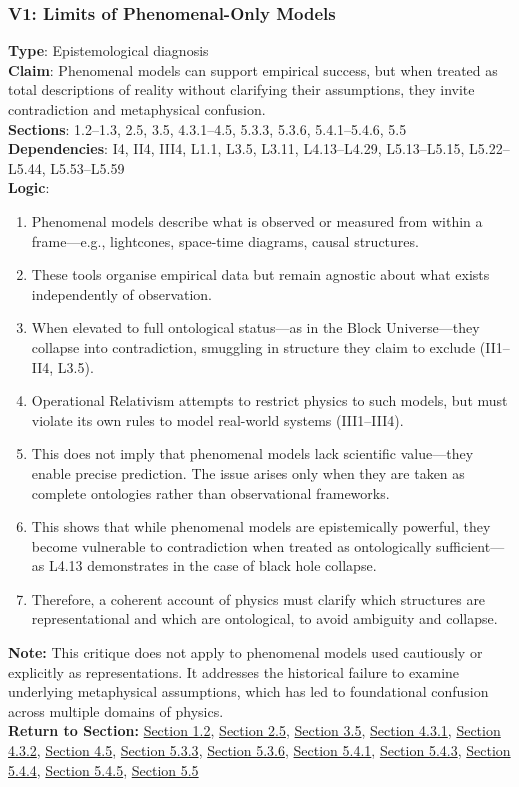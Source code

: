 \documentclass[12pt]{book}
\begin{document}
\subsubsection*{V1: Limits of Phenomenal-Only Models}
\label{appendix:V1}
\textbf{Type}: Epistemological diagnosis\\
\textbf{Claim}: Phenomenal models can support empirical success, but when treated as total descriptions of reality without clarifying their assumptions, they invite contradiction and metaphysical confusion.\\
\textbf{Sections}: 1.2–1.3, 2.5, 3.5, 4.3.1–4.5, 5.3.3, 5.3.6, 5.4.1–5.4.6, 5.5\\
\textbf{Dependencies}: I4, II4, III4, L1.1, L3.5, L3.11, L4.13–L4.29, L5.13–L5.15, L5.22–L5.44, L5.53–L5.59\\
\textbf{Logic}:
\begin{enumerate}
    \item Phenomenal models describe what is observed or measured from within a frame---e.g., lightcones, space-time diagrams, causal structures.
    \item These tools organise empirical data but remain agnostic about what exists independently of observation.
    \item When elevated to full ontological status---as in the Block Universe---they collapse into contradiction, smuggling in structure they claim to exclude (II1–II4, L3.5).
    \item Operational Relativism attempts to restrict physics to such models, but must violate its own rules to model real-world systems (III1–III4).
    \item This does not imply that phenomenal models lack scientific value---they enable precise prediction. The issue arises only when they are taken as complete ontologies rather than observational frameworks.
    \item This shows that while phenomenal models are epistemically powerful, they become vulnerable to contradiction when treated as ontologically sufficient---as L4.13 demonstrates in the case of black hole collapse.
    \item Therefore, a coherent account of physics must clarify which structures are representational and which are ontological, to avoid ambiguity and collapse.
\end{enumerate}
\textbf{Note:} This critique does not apply to phenomenal models used cautiously or explicitly as representations. It addresses the historical failure to examine underlying metaphysical assumptions, which has led to foundational confusion across multiple domains of physics.\\
\textbf{Return to Section:} \hyperref[sec:1.2]{Section 1.2}, \hyperref[sec:2.5]{Section 2.5}, \hyperref[sec:3.5]{Section 3.5}, \hyperref[sec:4.3.1]{Section 4.3.1}, \hyperref[sec:4.3.2]{Section 4.3.2}, \hyperref[sec:4.5]{Section 4.5}, \hyperref[sec:5.3.3]{Section 5.3.3}, \hyperref[sec:5.3.6]{Section 5.3.6}, \hyperref[sec:5.4.1]{Section 5.4.1}, \hyperref[sec:5.4.3]{Section 5.4.3}, \hyperref[sec:5.4.4]{Section 5.4.4}, \hyperref[sec:5.4.5]{Section 5.4.5}, \hyperref[sec:5.5]{Section 5.5}
\end{document}
